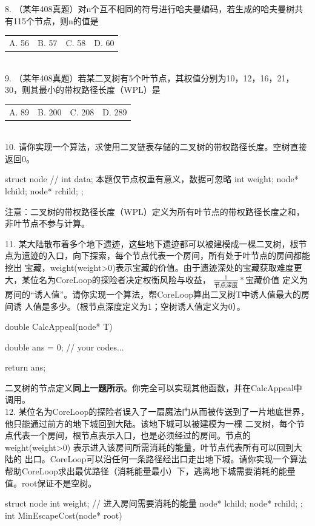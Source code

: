 \begin{exercise}
    8. （某年408真题）对n个互不相同的符号进行哈夫曼编码，若生成的哈夫曼树共有115个节点，则n的值是\\[0.5em]
    \begin{tabular}{llll}
    A. 56 & B. 57 & C. 58 & D. 60
    \end{tabular}\\

    9. （某年408真题）若某二叉树有5个叶节点，其权值分别为10，12，16，21，30，则其最小的带权路径长度（WPL）是\underline{\hspace{1cm}}\\[0.5em]
    \begin{tabular}{llll}
        A. 89 & B. 200 & C. 208 & D. 289
    \end{tabular}\\
    

    10. 请你实现一个算法，求使用二叉链表存储的二叉树的带权路径长度。空树直接返回0。
    \begin{cppcode}
        struct node {
            // int data;  本题仅节点权重有意义，数据可忽略
            int weight;
            node* lchild; 
            node* rchild; 
        };
    \end{cppcode}
    注意：二叉树的带权路径长度（WPL）定义为所有叶节点的带权路径长度之和，非叶节点不参与计算。

    \vspace{\baselineskip}

    11. 某大陆散布着多个地下遗迹，这些地下遗迹都可以被建模成一棵二叉树，根节点为遗迹的入口，向下探索，每个节点代表一个房间，所有处于叶节点的房间都能挖出
    宝藏，weight(weight>0)表示宝藏的价值。由于遗迹深处的宝藏获取难度更大，某位名为CoreLoop的探险者决定权衡风险与收益，
     $\frac{1}{\text{节点深度}}*\text{宝藏价值}$ 定义为房间的“诱人值”。请你实现一个算法，帮CoreLoop算出二叉树T中诱人值最大的房间诱
     人值是多少。（根节点深度定义为1；空树诱人值定义为0）。
    \begin{cppcode}
        double CalcAppeal(node* T) {
            double ans = 0;
            // your codes...

            return ans;
        }
    \end{cppcode}
    二叉树的节点定义{\color{red}\textbf{同上一题所示}}。你完全可以实现其他函数，并在CalcAppeal中调用。\\

    12. 某位名为CoreLoop的探险者误入了一扇魔法门从而被传送到了一片地底世界，他只能通过前方的地下城回到大陆。该地下城可以被建模为一棵
    二叉树，每个节点代表一个房间，根节点表示入口，也是必须经过的房间。节点的 weight(weight>0) 表示进入该房间所需消耗的能量，叶节点代表所有可以回到大陆的
    出口。CoreLoop可以沿任何一条路径经出口走出地下城。请你实现一个算法帮助CoreLoop求出最优路径（消耗能量最小）下，逃离地下城需要消耗的能量值。root保证不是空树。
    \begin{cppcode}
        struct node {
            int weight;     // 进入房间需要消耗的能量
            node* lchild; 
            node* rchild; 
        };
        int MinEscapeCost(node* root) {
            
        }
    \end{cppcode}
    

\end{exercise}
\clearpage


